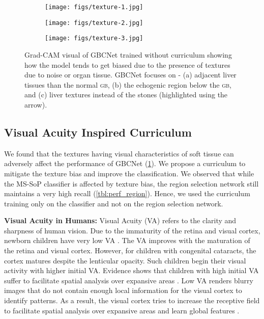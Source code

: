 \documentclass[10pt,twocolumn,letterpaper]{article}
\def\gb{\textsc{gb}\xspace}
\newcommand{\myfirstpara}[1]{\noindent \textbf{#1:}}
\newcommand{\mypara}[1]{\vspace{0.1em} \myfirstpara{#1}}
\begin{document}
 \begin{figure}[t]
    \centering
    \begin{subfigure}[b]{0.32\linewidth}
		\centering
		\texttt{[image: figs/texture-1.jpg]}
		\caption{}
\end{subfigure}
    \begin{subfigure}[b]{0.32\linewidth}
		\centering
		\texttt{[image: figs/texture-2.jpg]}
		\caption{}
\end{subfigure}
	\begin{subfigure}[b]{0.32\linewidth}
		\centering
		\texttt{[image: figs/texture-3.jpg]}
		\caption{}
\end{subfigure}
    \caption{Grad-CAM visual of GBCNet trained without curriculum showing how the model tends to get biased due to the presence of textures due to noise or organ tissue. GBCNet focuses on - (a) adjacent liver tissues than the normal \gb, (b) the echogenic region below the \gb, and (c) liver textures instead of the stones (highlighted using the arrow).}
    \label{fig:texture_bias_sample}
\end{figure}
\subsection{Visual Acuity Inspired Curriculum}
We found that the textures having visual characteristics of soft tissue can adversely affect the performance of GBCNet (\cref{fig:texture_bias_sample}). We propose a curriculum to mitigate the texture bias and improve the classification. We observed that while the MS-SoP classifier is affected by texture bias, the region selection network still maintains a very high recall (\cref{tbl:perf_region}). Hence, we used the curriculum training only on the classifier and not on the region selection network.

\mypara{Visual Acuity in Humans}
Visual Acuity (VA) refers to the clarity and sharpness of human vision. Due to the immaturity of the retina and visual cortex, newborn children have very low VA \cite{courage1990visual}. The VA improves with the maturation of the retina and visual cortex. However, for children with congenital cataracts, the cortex matures despite the lenticular opacity. Such children begin their visual activity with higher initial VA. Evidence shows that children with high initial VA suffer to facilitate spatial analysis over expansive areas \cite{vogelsang2018VisualAcuity}.  Low VA renders blurry images that do not contain enough local information for the visual cortex to identify patterns. As a result, the visual cortex tries to increase the receptive field to facilitate spatial analysis over expansive areas and learn global features \cite{kwon2016compensation, smith2009smile}. 
\end{document}
